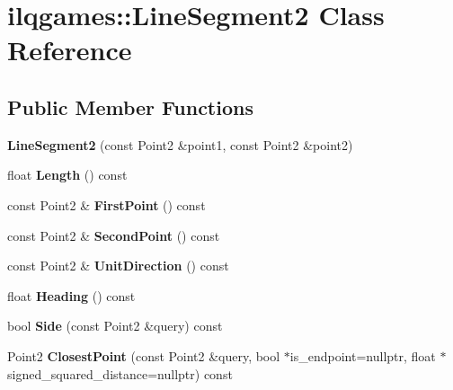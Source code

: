 \hypertarget{classilqgames_1_1_line_segment2}{}\section{ilqgames\+:\+:Line\+Segment2 Class Reference}
\label{classilqgames_1_1_line_segment2}
\subsection*{Public Member Functions}
\begin{DoxyCompactItemize}
\item 
{\bfseries Line\+Segment2} (const Point2 \&point1, const Point2 \&point2)\hypertarget{classilqgames_1_1_line_segment2_a364902f44220f68ea07588641a6778fd}{}\label{classilqgames_1_1_line_segment2_a364902f44220f68ea07588641a6778fd}

\item 
float {\bfseries Length} () const \hypertarget{classilqgames_1_1_line_segment2_a4458797af59ef84bd7ef875a1db3ff14}{}\label{classilqgames_1_1_line_segment2_a4458797af59ef84bd7ef875a1db3ff14}

\item 
const Point2 \& {\bfseries First\+Point} () const \hypertarget{classilqgames_1_1_line_segment2_a1374aed3332613dd7790b4f5dfa4d710}{}\label{classilqgames_1_1_line_segment2_a1374aed3332613dd7790b4f5dfa4d710}

\item 
const Point2 \& {\bfseries Second\+Point} () const \hypertarget{classilqgames_1_1_line_segment2_a513513fbd19254698a2f87fa6f650560}{}\label{classilqgames_1_1_line_segment2_a513513fbd19254698a2f87fa6f650560}

\item 
const Point2 \& {\bfseries Unit\+Direction} () const \hypertarget{classilqgames_1_1_line_segment2_a59a4eb9563be4a49d64deee301f4be6b}{}\label{classilqgames_1_1_line_segment2_a59a4eb9563be4a49d64deee301f4be6b}

\item 
float {\bfseries Heading} () const \hypertarget{classilqgames_1_1_line_segment2_a5a11245e7e612d222795f03e68eb31c1}{}\label{classilqgames_1_1_line_segment2_a5a11245e7e612d222795f03e68eb31c1}

\item 
bool {\bfseries Side} (const Point2 \&query) const \hypertarget{classilqgames_1_1_line_segment2_a788a9936c769a6664b824614e4f7d764}{}\label{classilqgames_1_1_line_segment2_a788a9936c769a6664b824614e4f7d764}

\item 
Point2 {\bfseries Closest\+Point} (const Point2 \&query, bool $\ast$is\+\_\+endpoint=nullptr, float $\ast$signed\+\_\+squared\+\_\+distance=nullptr) const \hypertarget{classilqgames_1_1_line_segment2_a13944bbafcdae15692706c0859b5d3d5}{}\label{classilqgames_1_1_line_segment2_a13944bbafcdae15692706c0859b5d3d5}

\end{DoxyCompactItemize}


